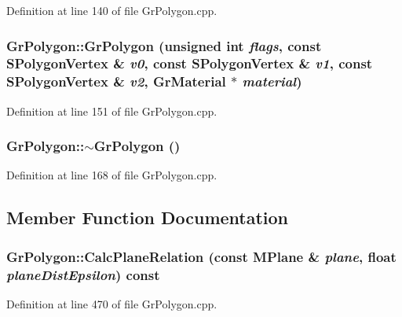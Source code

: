 \begin{CompactItemize}
Definition at line 140 of file GrPolygon.cpp.\hypertarget{class_gr_polygon_ea7e55bfc699301c5c65b5f63cf17bc0}{
\subsubsection[{GrPolygon}]{\setlength{\rightskip}{0pt plus 5cm}GrPolygon::GrPolygon (unsigned int {\em flags}, \/  const {\bf SPolygonVertex} \& {\em v0}, \/  const {\bf SPolygonVertex} \& {\em v1}, \/  const {\bf SPolygonVertex} \& {\em v2}, \/  {\bf GrMaterial} $\ast$ {\em material})}}
\label{class_gr_polygon_ea7e55bfc699301c5c65b5f63cf17bc0}




Definition at line 151 of file GrPolygon.cpp.\hypertarget{class_gr_polygon_f97e8da5717982c01a838b9a48897a71}{
\subsubsection[{$\sim$GrPolygon}]{\setlength{\rightskip}{0pt plus 5cm}GrPolygon::$\sim$GrPolygon ()}}
\label{class_gr_polygon_f97e8da5717982c01a838b9a48897a71}




Definition at line 168 of file GrPolygon.cpp.

\subsection{Member Function Documentation}
\hypertarget{class_gr_polygon_fc680ccb262eb784f0ba74deac1c36b0}{
\subsubsection[{CalcPlaneRelation}]{ GrPolygon::CalcPlaneRelation (const {\bf MPlane} \& {\em plane}, \/  float {\em planeDistEpsilon}) const}}
\label{class_gr_polygon_fc680ccb262eb784f0ba74deac1c36b0}




Definition at line 470 of file GrPolygon.cpp.\hypertarget{class_gr_polygon_30966480a994228549847bb03e9f1874}{
}
\end{CompactItemize}
